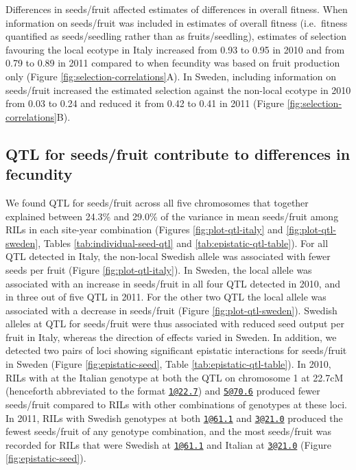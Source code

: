 \documentclass[
]{article}
\begin{document}
Differences in seeds/fruit affected estimates of differences in overall fitness. When information on seeds/fruit was included in estimates of overall fitness (i.e.~fitness quantified as seeds/seedling rather than as fruits/seedling), estimates of selection favouring the local ecotype in Italy increased from
0.93
to
0.95
in 2010 and from
0.79
to
0.89
in 2011 compared to when fecundity was based on fruit production only (Figure \ref{fig:selection-correlations}A). In Sweden, including information on seeds/fruit increased the estimated selection against the non-local ecotype in 2010 from
0.03
to
0.24
and reduced it from
0.42
to
0.41
in 2011 (Figure \ref{fig:selection-correlations}B).

\hypertarget{qtl-for-seedsfruit-contribute-to-differences-in-fecundity}{%
\subsection{QTL for seeds/fruit contribute to differences in fecundity}\label{qtl-for-seedsfruit-contribute-to-differences-in-fecundity}}

We found QTL for seeds/fruit across all five chromosomes that together explained between 24.3\% and 29.0\% of the variance in mean seeds/fruit among RILs in each site-year combination (Figures \ref{fig:plot-qtl-italy} and \ref{fig:plot-qtl-sweden}, Tables \ref{tab:individual-seed-qtl} and \ref{tab:epistatic-qtl-table}). For all QTL detected in Italy, the non-local Swedish allele was associated with fewer seeds per fruit (Figure \ref{fig:plot-qtl-italy}). In Sweden, the local allele was associated with an increase in seeds/fruit in all four QTL detected in 2010, and in three out of five QTL in 2011. For the other two QTL the local allele was associated with a decrease in seeds/fruit (Figure \ref{fig:plot-qtl-sweden}). Swedish alleles at QTL for seeds/fruit were thus associated with reduced seed output per fruit in Italy, whereas the direction of effects varied in Sweden. In addition, we detected two pairs of loci showing significant epistatic interactions for seeds/fruit in Sweden (Figure \ref{fig:epistatic-seed}, Table \ref{tab:epistatic-qtl-table}). In 2010, RILs with at the Italian genotype at both the QTL on chromosome 1 at 22.7cM (henceforth abbreviated to the format \href{mailto:1@22.7}{\nolinkurl{1@22.7}}) and \href{mailto:5@70.6}{\nolinkurl{5@70.6}} produced fewer seeds/fruit compared to RILs with other combinations of genotypes at these loci. In 2011, RILs with Swedish genotypes at both \href{mailto:1@61.1}{\nolinkurl{1@61.1}} and \href{mailto:3@21.0}{\nolinkurl{3@21.0}} produced the fewest seeds/fruit of any genotype combination, and the most seeds/fruit was recorded for RILs that were Swedish at \href{mailto:1@61.1}{\nolinkurl{1@61.1}} and Italian at \href{mailto:3@21.0}{\nolinkurl{3@21.0}} (Figure \ref{fig:epistatic-seed}).
\end{document}
